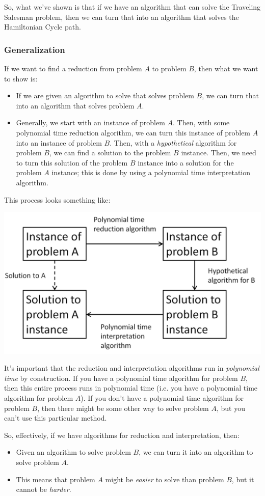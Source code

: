 \documentclass[letterpaper]{article}
\begin{document}
\bigskip 

So, what we've shown is that if we have an algorithm that can solve the Traveling Salesman problem, then we can turn that into an algorithm that solves the Hamiltonian Cycle path. 

\subsubsection{Generalization}
If we want to find a reduction from problem $A$ to problem $B$, then what we want to show is: 
\begin{itemize}
    \item If we are given an algorithm to solve that solves problem $B$, we can turn that into an algorithm that solves problem $A$. 
    \item Generally, we start with an instance of problem $A$. Then, with some polynomial time reduction algorithm, we can turn this instance of problem $A$ into an instance of problem $B$. Then, with a \emph{hypothetical} algorithm for problem $B$, we can find a solution to the problem $B$ instance. Then, we need to turn this solution of the problem $B$ instance into a solution for the problem $A$ instance; this is done by using a polynomial time interpretation algorithm. 
\end{itemize}
This process looks something like: 
\begin{center}
    \includegraphics[scale=0.4]{../assets/reduction_cycle.png}
\end{center}
It's important that the reduction and interpretation algorithms run in \emph{polynomial time} by construction. If you have a polynomial time algorithm for problem $B$, then this entire process runs in polynomial time (i.e. you have a polynomial time algorithm for problem $A$). If you don't have a polynomial time algorithm for problem $B$, then there might be some other way to solve problem $A$, but you can't use this particular method. 

\bigskip 

So, effectively, if we have algorithms for reduction and interpretation, then: 
\begin{itemize}
    \item Given an algorithm to solve problem $B$, we can turn it into an algorithm to solve problem $A$. 
    \item This means that problem $A$ might be \emph{easier} to solve than problem $B$, but it cannot be \emph{harder}.
\end{itemize}
\end{document}
